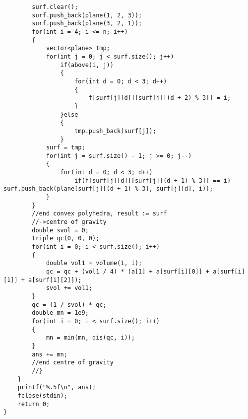 \begin{lstlisting}
		surf.clear();
		surf.push_back(plane(1, 2, 3));
		surf.push_back(plane(3, 2, 1));
		for(int i = 4; i <= n; i++)
		{
			vector<plane> tmp;
			for(int j = 0; j < surf.size(); j++)
				if(above(i, j))
				{
					for(int d = 0; d < 3; d++)
					{
						f[surf[j][d]][surf[j][(d + 2) % 3]] = i;
					}
				}else
				{
					tmp.push_back(surf[j]);
				}
			surf = tmp;
			for(int j = surf.size() - 1; j >= 0; j--)
			{
				for(int d = 0; d < 3; d++)
					if(f[surf[j][d]][surf[j][(d + 1) % 3]] == i) surf.push_back(plane(surf[j][(d + 1) % 3], surf[j][d], i));
			}
		}
		//end convex polyhedra, result := surf
		//->centre of gravity
		double svol = 0;
		triple qc(0, 0, 0);
		for(int i = 0; i < surf.size(); i++)
		{
			double vol1 = volume(1, i);
			qc = qc + (vol1 / 4) * (a[1] + a[surf[i][0]] + a[surf[i][1]] + a[surf[i][2]]);
			svol += vol1;
		}
		qc = (1 / svol) * qc;
		double mn = 1e9;
		for(int i = 0; i < surf.size(); i++)
		{
			mn = min(mn, dis(qc, i));
		}
		ans += mn;
		//end centre of gravity
		//}
	}
	printf("%.5f\n", ans);
	fclose(stdin);
	return 0;
}
\end{lstlisting}
